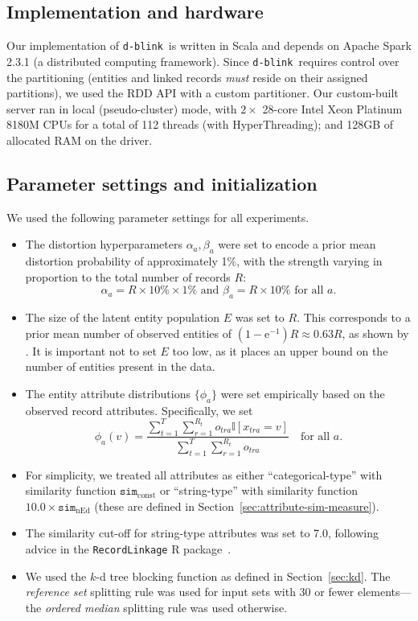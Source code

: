 \documentclass[12pt,letterpaper]{article}
\newcommand{\simfn}{\mathtt{sim}} %
\newcommand{\1}[1]{\mathbb{I}\!\left[#1\right]} %
\newcommand{\euler}{\mathrm{e}} %
\newcommand{\dblink}{\texttt{\upshape \lowercase{d-blink}}} %
\begin{document}
\subsection{Implementation and hardware}
Our implementation of \dblink\ is written in Scala and depends on 
Apache Spark 2.3.1 (a distributed computing framework).
Since \dblink\ requires control over the partitioning (entities and 
linked records \emph{must} reside on their assigned partitions), we 
used the RDD API with a custom partitioner.
Our custom-built server ran in local (pseudo-cluster) mode, with
$2 \times$ 28-core Intel Xeon Platinum 8180M CPUs for a total of 112 
threads (with HyperThreading); and 128GB of allocated RAM on the driver.

\subsection{Parameter settings and initialization} 
\label{app-sec:parameter-settings}
We used the following parameter settings for all experiments.
\begin{itemize}
  \item The distortion hyperparameters $\alpha_{a}, \beta_{a}$ were set to 
  encode a prior mean distortion probability of approximately 1\%, with the 
  strength varying in proportion to the total number of records $R$:
  \begin{equation*}
  \alpha_{a} = R \times 10\% \times 1\% \text{ and }
    \beta_{a} = R \times 10\% \text{ for all } a.
  \end{equation*}
  \item The size of the latent entity population $E$ was set to $R$.
  This corresponds to a prior mean number of observed entities of 
  $(1 - \euler^{-1}) R \approx 0.63 R$, as shown by 
  \citet{steorts_bayesian_2016}.
  It is important not to set $E$ too low, as it places an upper bound 
  on the number of entities present in the data. 
  \item The entity attribute distributions $\{\phi_a\}$ were set empirically
  based on the observed record attributes. Specifically, we set 
  \begin{equation*}
    \phi_a(v) = \frac{\sum_{t = 1}^{T} \sum_{r = 1}^{R_t} o_{tra} \1{x_{tra} = v}}
      {\sum_{t = 1}^{T} \sum_{r = 1}^{R_t} o_{tra}} \quad \text{for all } a.
  \end{equation*}
  \item For simplicity, we treated all attributes as either 
  ``categorical-type''  with similarity function $\simfn_{\mathrm{const}}$ or 
  ``string-type'' with similarity function $10.0 \times \simfn_{\mathrm{nEd}}$ 
  (these are defined in Section~\ref{sec:attribute-sim-measure}).
  \item The similarity cut-off for string-type attributes was set to 7.0, 
  following advice in the \texttt{RecordLinkage} R 
  package~\citep{sariyar_recordlinkage_2010}.
  \item We used the $k$-d tree blocking function as defined in 
  Section~\ref{sec:kd}.
  The \emph{reference set} splitting rule was used for input sets with 30 or 
  fewer elements---the \emph{ordered median} splitting rule was used 
  otherwise.
\end{itemize}
\end{document}

